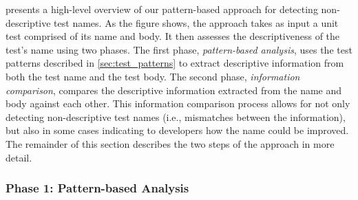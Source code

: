 \documentclass[proposal.tex]{subfiles}
\begin{document}
 presents a high-level overview of our pattern-based approach for detecting non-descriptive test names.
%
As the figure shows, the approach takes as input a unit test comprised of its name and body.
%
It then assesses the descriptiveness of the test's name using two phases.
%
The first phase, \emph{pattern-based analysis}, uses the test patterns described in \cref{sec:test_patterns} to extract descriptive information from both the test name and the test body.
%
The second phase, \emph{information comparison}, compares the descriptive information extracted from the name and body against each other.
%
This information comparison process allows for not only detecting non-descriptive test names (i.e., mismatches between the information), but also in some cases indicating to developers how the name could be improved.
%
The remainder of this section describes the two steps of the approach in more detail.

\subsubsection{Phase 1: Pattern-based Analysis}
\end{document}
